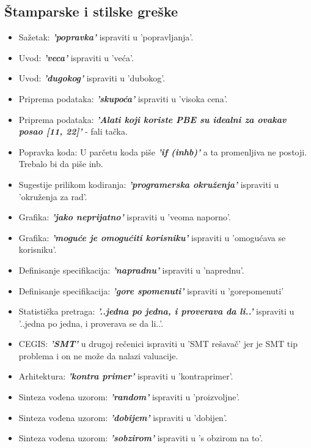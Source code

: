 \documentclass[a4paper]{report}
\begin{document}
\subsection{Štamparske i stilske greške}
\begin{itemize}
	\item Sažetak: \textbf{\textit{'popravka'}} ispraviti u 'popravljanja'.
	\item Uvod: \textbf{\textit{'veca'}} ispraviti u 'veća'.
    \item Uvod: \textbf{\textit{'dugokog'}} ispraviti u 'dubokog'.
    \item Priprema podataka: \textbf{\textit{'skupoća'}} ispraviti u 'visoka cena'.
    \item Priprema podataka: \textbf{\textit{'Alati koji koriste PBE su idealni za ovakav posao [11, 22]'}} - fali tačka.
    \item Popravka koda: U parčetu koda piše \textbf{\textit{'if (inhb)'}} a ta promenljiva ne postoji. Trebalo bi da piše inb.
    \item Sugestije prilikom kodiranja: \textbf{\textit{'programerska okruženja'}} ispraviti u 'okruženja za rad'.
    \item Grafika: \textbf{\textit{'jako neprijatno'}} ispraviti u 'veoma naporno'.
    \item Grafika: \textbf{\textit{'moguće je omogućiti korisniku'}} ispraviti u 'omogućava se korisniku'.
    \item Definisanje specifikacija: \textbf{\textit{'napradnu'}} ispraviti u 'naprednu'.
    \item Definisanje specifikacija: \textbf{\textit{'gore spomenuti'}} ispraviti u 'gorepomenuti'
    \item Statistička pretraga: \textbf{\textit{'..jedna po jedna, i proverava da li..'}} ispraviti u '..jedna po jedna, i proverava se da li..'.
    \item CEGIS: \textbf{\textit{'SMT'}} u drugoj rečenici ispraviti u 'SMT rešavač' jer je SMT tip problema i on ne može da nalazi valuacije.
    \item Arhitektura: \textbf{\textit{'kontra primer'}} ispraviti u 'kontraprimer'.
    \item Sinteza vođena uzorom: \textbf{\textit{'random'}} ispraviti u 'proizvoljne'.
    \item Sinteza vođena uzorom: \textbf{\textit{'dobijem'}} ispraviti u 'dobijen'.
    \item Sinteza vođena uzorom: \textbf{\textit{'sobzirom'}} ispraviti u 's obzirom na to'. 

\end{itemize}
\end{document}

